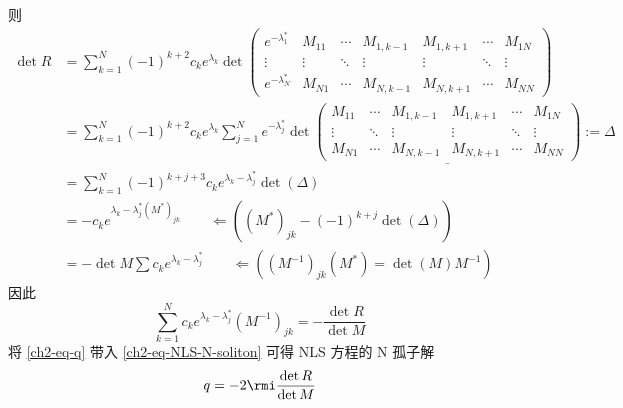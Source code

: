 则
\begin{equation}
    \begin{aligned}
        \det R & = \sum_{k=1}^{N}(-1)^{k+2} c_{k} e^{\lambda_{k}} \det \begin{pmatrix}
                                                                           e^{-\lambda_{1}^{*}} & M_{11} & \cdots & M_{1,k-1} & M_{1,k+1} & \cdots & M_{1N} \\
                                                                           \vdots               & \vdots & \ddots & \vdots    & \vdots    & \ddots & \vdots \\
                                                                           e^{-\lambda_{N}^{*}} & M_{N1} & \cdots & M_{N,k-1} & M_{N,k+1} & \cdots & M_{NN}
                                                                       \end{pmatrix}                  \\
               & = \sum_{k=1}^{N} (-1)^{k+2} c_{k} e^{\lambda_{k}} \sum_{j=1}^{N} e^{-\lambda_{j}^{*}} \det \underline{\begin{pmatrix}
                                                                                                                               M_{11} & \cdots & M_{1,k-1} & M_{1,k+1} & \cdots & M_{1N} \\
                                                                                                                               \vdots & \ddots & \vdots    & \vdots    & \ddots & \vdots \\
                                                                                                                               M_{N1} & \cdots & M_{N,k-1} & M_{N,k+1} & \cdots & M_{NN}
                                                                                                                           \end{pmatrix}} := \Delta \\
               & = \sum_{k=1}^{N}(-1)^{k+j+3}c_{k} e^{\lambda_{k} - \lambda_{j}^{*}} \det(\Delta)                                                                                \\
               & = -c_{k} e^{\lambda_{k} - \lambda_{j}^{*} (M^{*})_{jk}} \qquad \Leftarrow \left((M^{*})_{jk} - (-1)^{k+j} \det(\Delta) \right)                                  \\
               & = -\det M \sum c_{k}e^{\lambda_{k} - \lambda_{j}^{*}} \qquad \Leftarrow \left( (M^{-1})_{jk} (M^{*}) = \det(M) M^{-1} \right)
    \end{aligned}
\end{equation}
因此
\begin{equation}
    \sum_{k=1}^{N} c_{k} e^{\lambda_{k} - \lambda_{j}^{*}}(M^{-1})_{jk} = - \frac{\det R}{\det M} \label{ch2-eq-q}
\end{equation}
将 \eqref{ch2-eq-q} 带入 \eqref{ch2-eq-NLS-N-soliton} 可得 NLS 方程的 N 孤子解
\begin{equation}
    q = -2 \rmi \frac{\det R}{ \det M}
\end{equation}
